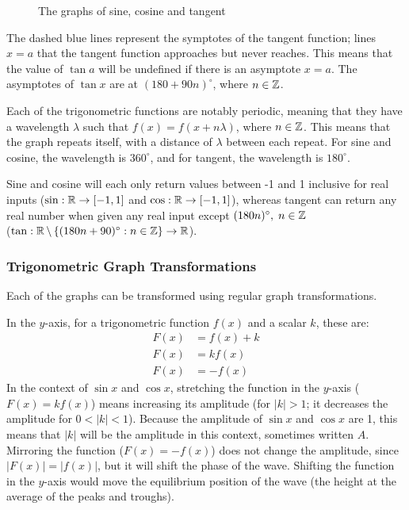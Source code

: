 \begin{figure}
            \caption{The graphs of sine, cosine and tangent}
        \end{figure}
        The dashed blue lines represent the symptotes of the tangent function; lines $x=a$ that the tangent function approaches but never reaches.
        This means that the value of $\tan a$ will be undefined if there is an asymptote $x=a$.
        The asymptotes of $\tan x$ are at $(180+90n)^\circ$, where $n\in\operatorname{\mathbb{Z}}$.

        Each of the trigonometric functions are notably periodic, meaning that they have a wavelength $\lambda$ such that $f(x)=f(x+n\lambda)$, where $n\in\operatorname{\mathbb{Z}}$.
        This means that the graph repeats itself, with a distance of $\lambda$ between each repeat.
        For sine and cosine, the wavelength is $360^\circ$, and for tangent, the wavelength is $180^\circ$.

        Sine and cosine will each only return values between -1 and 1 inclusive for real inputs ($\sin:\operatorname{\mathbb{R}}\to[-1,1]$ and $\cos:\operatorname{\mathbb{R}}\to[-1,1]$), whereas tangent can return any real number when given any real input except $(180n)^\circ,\;n\in\operatorname{\mathbb{Z}}$ \\ ($\tan:\operatorname{\mathbb{R}}\setminus\left\{(180n+90)^\circ:n\in\operatorname{\mathbb{Z}}\right\}\to\operatorname{\mathbb{R}}$).

        \subsubsection{Trigonometric Graph Transformations}
            Each of the graphs can be transformed using regular graph transformations.

            In the $y$-axis, for a trigonometric function $f(x)$ and a scalar $k$, these are:
            \begin{align}
                F(x)&=f(x)+k \\
                F(x)&=kf(x) \\
                F(x)&=-f(x)
            \end{align}
            In the context of $\sin x$ and $\cos x$, stretching the function in the $y$-axis ($F(x)=kf(x)$) means increasing its amplitude (for $|k|>1$; it decreases the amplitude for $0<|k|<1$).
            Because the amplitude of $\sin x$ and $\cos x$ are 1, this means that $|k|$ will be the amplitude in this context, sometimes written $A$.
            Mirroring the function ($F(x)=-f(x)$) does not change the amplitude, since $|F(x)|=|f(x)|$, but it will shift the phase of the wave.
            Shifting the function in the $y$-axis would move the equilibrium position of the wave (the height at the average of the peaks and troughs).
            

